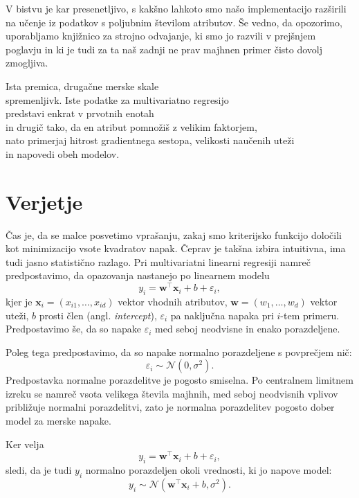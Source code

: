 V bistvu je kar presenetljivo, s kakšno lahkoto smo našo implementacijo razširili na učenje iz podatkov s poljubnim številom atributov. Še vedno, da opozorimo, uporabljamo knjižnico za strojno odvajanje, ki smo jo razvili v prejšnjem poglavju in ki je tudi za ta naš zadnji ne prav majhnen primer čisto dovolj zmogljiva.

\begin{exercise}{Ista premica, drugačne merske skale\\ spremenljivk.}
Iste podatke za multivariatno regresijo\\
predstavi enkrat v prvotnih enotah\\
in drugič tako, da en atribut pomnožiš z velikim faktorjem,\\
nato primerjaj hitrost gradientnega sestopa, velikosti naučenih uteži\\
in napovedi obeh modelov.
\end{exercise}

\section{Verjetje}

Čas je, da se malce posvetimo vprašanju, zakaj smo kriterijsko funkcijo določili kot minimizacijo vsote kvadratov napak. Čeprav je takšna izbira intuitivna, ima tudi jasno statistično razlago. Pri multivariatni linearni regresiji namreč predpostavimo, da opazovanja nastanejo po linearnem modelu
%
\[
y_i = \mathbf{w}^\top \mathbf{x}_i + b + \varepsilon_i ,
\]
%
kjer je \(\mathbf{x}_i = (x_{i1}, \dots, x_{id})\) vektor vhodnih atributov,  
\(\mathbf{w} = (w_1, \dots, w_d)\) vektor uteži, \(b\) prosti člen (angl. {\em intercept}),  
\(\varepsilon_i\) pa naključna napaka pri \(i\)-tem primeru. Predpostavimo še, da so napake \(\varepsilon_i\) med seboj neodvisne in enako porazdeljene. 

Poleg tega predpostavimo, da so napake normalno porazdeljene s povprečjem nič:
\[
\varepsilon_i \sim \mathcal{N}(0, \sigma^2).
\]
%
Predpostavka normalne porazdelitve je pogosto smiselna. Po centralnem limitnem izreku se namreč vsota velikega števila majhnih, med seboj neodvisnih vplivov približuje normalni porazdelitvi, zato je normalna porazdelitev pogosto dober model za merske napake.

Ker velja
%
\[
y_i = \mathbf{w}^\top \mathbf{x}_i + b + \varepsilon_i ,
\]
%
sledi, da je tudi \(y_i\) normalno porazdeljen okoli vrednosti, ki jo napove model:
%
\[
y_i \sim \mathcal{N}(\mathbf{w}^\top \mathbf{x}_i + b, \sigma^2).
\]

